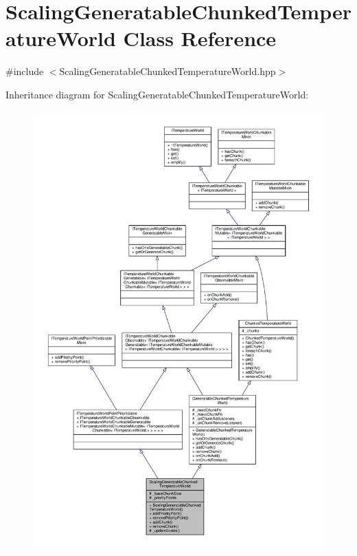 \hypertarget{class_scaling_generatable_chunked_temperature_world}{\section{Scaling\-Generatable\-Chunked\-Temperature\-World Class Reference}
\label{class_scaling_generatable_chunked_temperature_world}
}


{\ttfamily \#include $<$Scaling\-Generatable\-Chunked\-Temperature\-World.\-hpp$>$}



Inheritance diagram for Scaling\-Generatable\-Chunked\-Temperature\-World\-:
\nopagebreak
\begin{figure}[H]
\begin{center}
\leavevmode
\includegraphics[width=350pt]{class_scaling_generatable_chunked_temperature_world__inherit__graph}
\end{center}
\end{figure}


